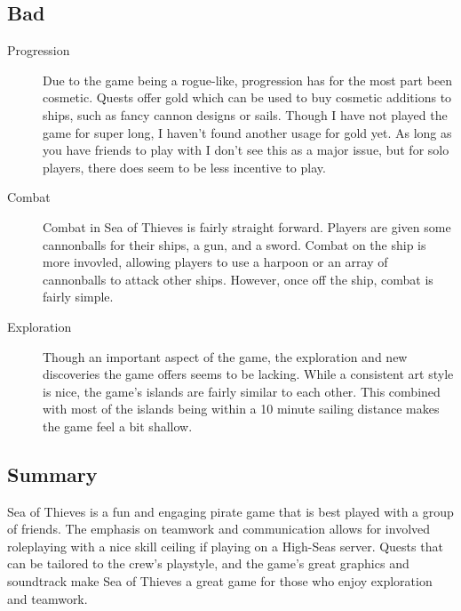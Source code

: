 \documentclass{article}
\begin{document}
\subsection{Bad}
\begin{description}
      \item[Progression] Due to the game being a rogue-like, progression has for
            the most part been cosmetic. Quests offer gold which can be used to buy
            cosmetic additions to ships, such as fancy cannon designs or sails.
            Though I have not played the game for super long, I haven't found
            another usage for gold yet. As long as you have friends to play with
            I don't see this as a major issue, but for solo players, there does
            seem to be less incentive to play.
      \item[Combat] Combat in Sea of Thieves is fairly straight forward. Players
            are given some cannonballs for their ships, a gun, and a sword.
            Combat on the ship is more invovled, allowing players to use a
            harpoon or an array of cannonballs to attack other ships. However,
            once off the ship, combat is fairly simple.
      \item[Exploration] Though an important aspect of the game, the exploration
            and new discoveries the game offers seems to be lacking. While a
            consistent art style is nice, the game's islands are fairly similar to
            each other. This combined with most of the islands being within a 10
            minute sailing distance makes the game feel a bit shallow.
\end{description}

\subsection{Summary}
Sea of Thieves is a fun and engaging pirate game that is best played with a
group of friends. The emphasis on teamwork and communication allows for involved
roleplaying with a nice skill ceiling if playing on a High-Seas server. Quests
that can be tailored to the crew's playstyle, and the game's great graphics and
soundtrack make Sea of Thieves a great game for those who enjoy exploration and
teamwork.
\end{document}
